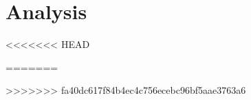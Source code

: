 \chapter{Analysis}





%

%
<<<<<<< HEAD


=======


>>>>>>> fa40dc617f84b4ec4c756ecebc96bf5aae3763a6




